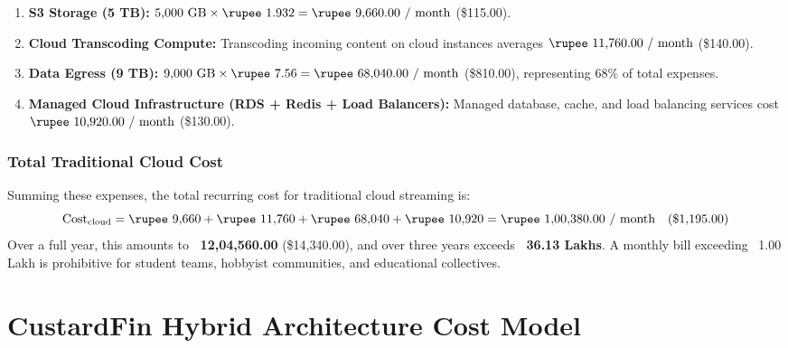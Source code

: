 \begin{enumerate}
    \item \textbf{S3 Storage (5 TB):}
    $5{,}000\text{ GB} \times \text{\rupee~1.932} = \mathbf{\text{\rupee~9{,}660.00 / month}}$ (\$115.00).
    
    \item \textbf{Cloud Transcoding Compute:}
    Transcoding incoming content on cloud instances averages $\mathbf{\text{\rupee~11{,}760.00 / month}}$ (\$140.00).
    
    \item \textbf{Data Egress (9 TB):}
    $9{,}000\text{ GB} \times \text{\rupee~7.56} = \mathbf{\text{\rupee~68{,}040.00 / month}}$ (\$810.00), representing 68\% of total expenses.
    
    \item \textbf{Managed Cloud Infrastructure (RDS + Redis + Load Balancers):}
    Managed database, cache, and load balancing services cost $\mathbf{\text{\rupee~10{,}920.00 / month}}$ (\$130.00).
\end{enumerate}

\subsubsection{Total Traditional Cloud Cost}
Summing these expenses, the total recurring cost for traditional cloud streaming is:
\begin{equation}
    \text{Cost}_{\text{cloud}} = \text{\rupee~9,660} + \text{\rupee~11,760} + \text{\rupee~68,040} + \text{\rupee~10,920} = \mathbf{\text{\rupee~1{,}00{,}380.00 / month}} \quad (\$1{,}195.00)
\end{equation}
Over a full year, this amounts to \textbf{\rupee~12{,}04{,}560.00} (\$14,340.00), and over three years exceeds \textbf{\rupee~36.13 Lakhs}. A monthly bill exceeding \rupee~1.00 Lakh is prohibitive for student teams, hobbyist communities, and educational collectives.

\section{CustardFin Hybrid Architecture Cost Model}
\label{sec:cost_custardfin}


